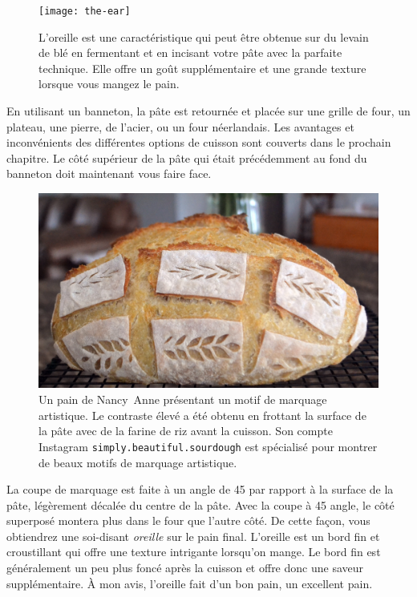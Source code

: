 \begin{figure}[htb!]
  \texttt{[image: the-ear]}
  \caption[Oreille du pain]{L'oreille est une caractéristique qui peut être obtenue sur
      du levain de blé en fermentant et en incisant votre pâte avec la parfaite
      technique. Elle offre un goût supplémentaire et une grande texture lorsque vous
      mangez le pain.}%
  \label{fig:the-ear}
\end{figure}

En utilisant un banneton, la pâte est retournée et
placée sur une grille de four, un plateau, une pierre, de l'acier, ou un four néerlandais. Les avantages
et inconvénients des différentes options de cuisson sont couverts dans le prochain chapitre.
Le côté supérieur de la pâte qui était précédemment au fond du
banneton doit maintenant vous faire face.

\begin{figure}[htb!]
  \includegraphics[width=\textwidth]{artistic-scoring}
  \caption[Marquage artistique]{Un pain de Nancy~Anne présentant un motif de
      marquage artistique.  Le contraste élevé a été obtenu en frottant la surface de la pâte
      avec de la farine de riz avant la cuisson. Son compte Instagram
      \texttt{simply.beautiful.sourdough} est spécialisé pour montrer de beaux
      motifs de marquage artistique.}%
  \label{fig:artistic-scoring}
\end{figure}

La coupe de marquage est faite à un angle de \qty{45}{\angle} par rapport à la surface de la pâte, légèrement décalée du centre de la pâte. Avec la coupe à \qty{45}{\angle} angle, le côté superposé montera plus dans le four que l'autre côté.
De cette façon, vous obtiendrez une soi-disant \emph{oreille} sur le pain final.
L'oreille est un bord fin et croustillant qui offre une texture intrigante
lorsqu'on mange. Le bord fin est généralement un peu plus foncé après la cuisson
et offre donc une saveur supplémentaire. À mon avis, l'oreille fait
d'un bon pain, un excellent pain.

